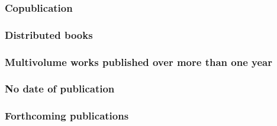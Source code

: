\documentclass[11pt,letterpaper,oneside]{article}
\begin{document}
\begin{citebib}
\item \cite{karavaev2015}
\item \cite{shumaker2014}
\end{citebib}

\setcounter{subsubsection}{139}
\subsubsection{Copublication}

\begin{citebib}
\item \cite{strauss1962}
\end{citebib}

\subsubsection{Distributed books}

\begin{citebib}
\item \cite{willke2007}
\end{citebib}

\setcounter{subsubsection}{143}
\subsubsection{Multivolume works published over more than one year}

\begin{citebib}
\item \cite{tillich1951}
\end{citebib}

\subsubsection{No date of publication}

\begin{citebib}
\item \cite{boston}
\item \cite{edinburgh1750}
\item \cite{edinburgh}
\end{citebib}

\subsubsection{Forthcoming publications}
\end{document}
